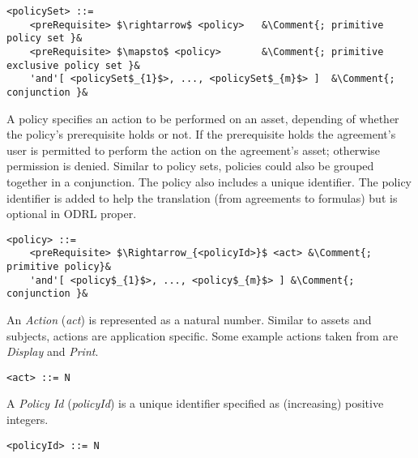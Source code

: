 \newcommand*{\Comment}[1]{\hfill\makebox[7.0cm][l]{#1}}%
\lstset{mathescape, language=AST, escapechar=\&}  
\begin{lstlisting}[frame=single, caption={policySet},label={lst:policySetast}]
<policySet> ::=  
	<preRequisite> $\rightarrow$ <policy>	&\Comment{; primitive policy set }&
	<preRequisite> $\mapsto$ <policy>		&\Comment{; primitive exclusive policy set }&
	'and'[ <policySet$_{1}$>, ..., <policySet$_{m}$> ]	&\Comment{; conjunction }&
\end{lstlisting}

A policy specifies an action to be performed on an asset, depending of whether the policy's prerequisite holds or not. If the prerequisite holds the agreement's user is permitted to perform the action on the agreement's asset; otherwise permission is denied. Similar to policy sets, policies could also be grouped together in a conjunction. The policy also includes a unique identifier. The policy identifier is added to help the translation (from agreements to formulas) but is optional in ODRL proper.


\lstset{mathescape, language=AST, escapechar=\&}  
\begin{lstlisting}[frame=single, caption={policy},label={lst:policyast}]
<policy> ::=  
	<preRequisite> $\Rightarrow_{<policyId>}$ <act> &\Comment{; primitive policy}&
	'and'[ <policy$_{1}$>, ..., <policy$_{m}$> ] &\Comment{; conjunction }&
\end{lstlisting}

An \emph{Action} (\emph{act}) is represented as a natural number. Similar to assets and subjects, actions are application specific. Some example actions taken from \cite{pucella2006} are \emph{Display} and \emph{Print}.

\lstset{mathescape, language=AST}  
\begin{lstlisting}[frame=single, caption={act},label={lst:actast}]
<act> ::= N
\end{lstlisting}

A \emph{Policy Id} (\emph{policyId}) is a unique identifier specified as (increasing) positive integers. 

\lstset{mathescape, language=AST}  
\begin{lstlisting}[frame=single, caption={policyId},label={lst:policyIdast}]
<policyId> ::= N
\end{lstlisting}

